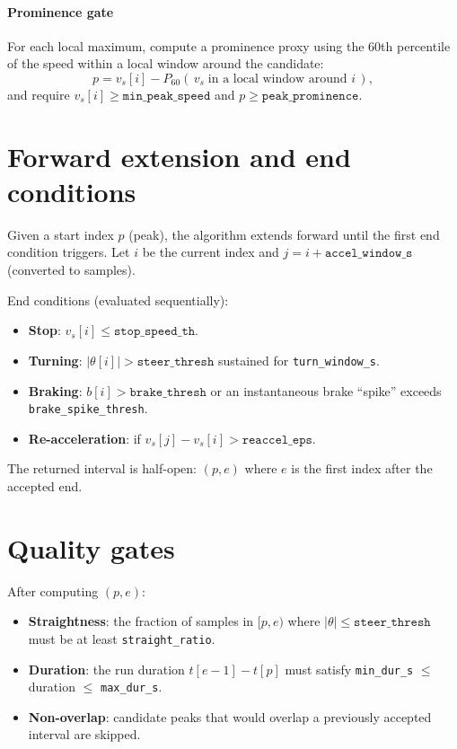 \documentclass[11pt,a4paper]{article}
\begin{document}
\paragraph{Prominence gate}
For each local maximum, compute a prominence proxy using the 60th percentile of
the speed within a local window around the candidate:
\[
  p = v_s[i] - P_{60}(\,v_s\;\text{in a local window around }i\,),
\]
and require $v_s[i] \ge \texttt{min\_peak\_speed}$ and $p \ge \texttt{peak\_prominence}$.

\section{Forward extension and end conditions}
Given a start index $p$ (peak), the algorithm extends forward until the first end condition triggers.
Let $i$ be the current index and $j=i+\texttt{accel\_window\_s}$ (converted to samples).

End conditions (evaluated sequentially):
\begin{itemize}
  \item \textbf{Stop}: $v_s[i] \le \texttt{stop\_speed\_th}$.
  \item \textbf{Turning}: $|\theta[i]| > \texttt{steer\_thresh}$ sustained for \texttt{turn\_window\_s}.
  \item \textbf{Braking}: $b[i] > \texttt{brake\_thresh}$ or an instantaneous brake ``spike'' exceeds \texttt{brake\_spike\_thresh}.
  \item \textbf{Re-acceleration}: if $v_s[j] - v_s[i] > \texttt{reaccel\_eps}$.
\end{itemize}

The returned interval is half-open: $(p,e)$ where $e$ is the first index after the accepted end.

\section{Quality gates}
After computing $(p,e)$:
\begin{itemize}
  \item \textbf{Straightness}: the fraction of samples in $[p,e)$ where $|\theta| \le \texttt{steer\_thresh}$ must be at least \texttt{straight\_ratio}.
  \item \textbf{Duration}: the run duration $t[e-1]-t[p]$ must satisfy \texttt{min\_dur\_s} $\le$ duration $\le$ \texttt{max\_dur\_s}.
  \item \textbf{Non-overlap}: candidate peaks that would overlap a previously accepted interval are skipped.
\end{itemize}
\end{document}
